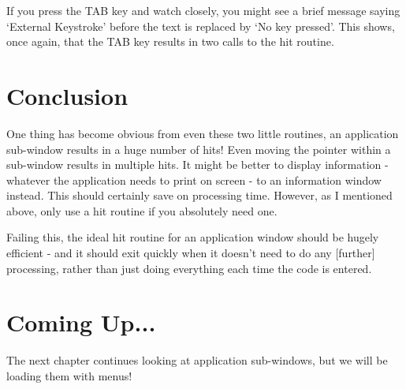 If you press the TAB key and watch closely, you might see a brief message
        saying `External Keystroke' before the text is replaced by `No key pressed'. This
        shows, once again, that the TAB key results in two calls to the hit
        routine.

\section{Conclusion}

One thing has become obvious from even these two little routines, an
        application sub-{}window results in a huge number of hits! Even moving the pointer
        within a sub-{}window results in multiple hits. It might be better to display
        information -{} whatever the application needs to print on screen -{} to an
        information window instead. This should certainly save on processing time.
        However, as I mentioned above, only use a hit routine if you absolutely need
        one.

Failing this, the ideal hit routine for an application window should be
        hugely efficient -{} and it should exit quickly when it doesn't need to do any
        [further] processing, rather than just doing everything each time the code is
        entered.

\section{Coming Up...}
\label{ch28-the-end}%

The next chapter continues looking at application sub-{}windows, but we will be
        loading them with menus!

